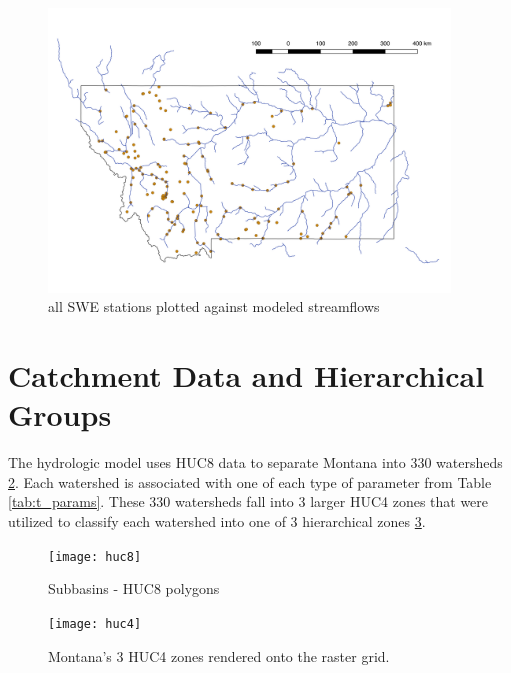 \begin{figure}[h]
    \centering
    \includegraphics[width=0.95\textwidth]{stations}
    \caption{all SWE stations plotted against modeled streamflows}
    \label{fig:stations}
\end{figure}

\section{Catchment Data and Hierarchical Groups}

The hydrologic model uses HUC8 data to separate Montana into 330 watersheds \ref{fig:huc8}. Each watershed is associated with one of each type of parameter from Table \ref{tab:t_params}. These 330 watersheds fall into 3 larger HUC4 zones that were utilized to classify each watershed into one of 3 hierarchical zones \ref{fig:huc4}.

\begin{figure}[h]
    \centering
    \texttt{[image: huc8]}
    \caption{Subbasins - HUC8 polygons}
    \label{fig:huc8}
\end{figure}

\begin{figure}[h]
    \centering
    \texttt{[image: huc4]}
    \caption{Montana's 3 HUC4 zones rendered onto the raster grid.}
    \label{fig:huc4}
\end{figure}
